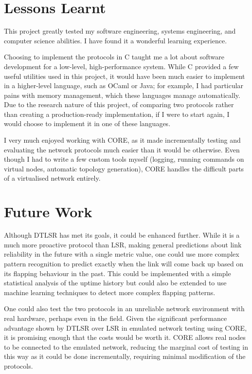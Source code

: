 \documentclass[withindex,glossary,openany]{cam-thesis}
\begin{document}
\section{Lessons Learnt}

This project greatly tested my software engineering, systems engineering, and computer science abilities. I have found it a wonderful learning experience.

Choosing to implement the protocols in C taught me a lot about software development for a low-level, high-performance system. While C provided a few useful utilities used in this project, it would have been much easier to implement in a higher-level language, such as OCaml or Java; for example, I had particular pains with memory management, which these languages manage automatically. Due to the research nature of this project, of comparing two protocols rather than creating a production-ready implementation, if I were to start again, I would choose to implement it in one of these languages.

I very much enjoyed working with CORE, as it made incrementally testing and evaluating the network protocols much easier than it would be otherwise. Even though I had to write a few custom tools myself (logging, running commands on virtual nodes, automatic topology generation), CORE handles the difficult parts of a virtualised network entirely.

\section{Future Work}

Although DTLSR has met its goals, it could be enhanced further. While it is a much more proactive protocol than LSR, making general predictions about link reliability in the future with a single metric value, one could use more complex pattern recognition to predict exactly when the link will come back up based on its flapping behaviour in the past. This could be implemented with a simple statistical analysis of the uptime history but could also be extended to use machine learning techniques to detect more complex flapping patterns.

One could also test the two protocols in an unreliable network environment with real hardware, perhaps even in the field. Given the significant performance advantage shown by DTLSR over LSR in emulated network testing using CORE, it is promising enough that the costs would be worth it. CORE allows real nodes to be connected to the emulated network, reducing the marginal cost of testing in this way as it could be done incrementally, requiring minimal modification of the protocols.
\end{document}
